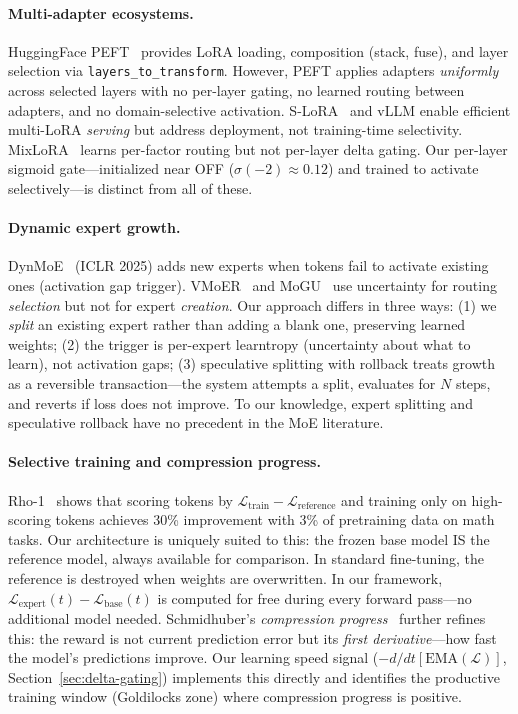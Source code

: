 \documentclass{article}
\begin{document}
\paragraph{Multi-adapter ecosystems.}
HuggingFace PEFT~\cite{peft2023} provides LoRA loading, composition (stack,
fuse), and layer selection via \texttt{layers\_to\_transform}. However, PEFT
applies adapters \emph{uniformly} across selected layers with no per-layer
gating, no learned routing between adapters, and no domain-selective
activation. S-LoRA~\cite{slora2023} and vLLM enable efficient multi-LoRA
\emph{serving} but address deployment, not training-time selectivity.
MixLoRA~\cite{mixlora2024} learns per-factor routing but not per-layer
delta gating. Our per-layer sigmoid gate---initialized near OFF
($\sigma(-2) \approx 0.12$) and trained to activate selectively---is
distinct from all of these.

\paragraph{Dynamic expert growth.}
DynMoE~\cite{dynmoe2025} (ICLR 2025) adds new experts when tokens fail to
activate existing ones (activation gap trigger). VMoER~\cite{vmoer2025} and
MoGU~\cite{mogu2025} use uncertainty for routing \emph{selection} but not
for expert \emph{creation}. Our approach differs in three ways: (1) we
\emph{split} an existing expert rather than adding a blank one, preserving
learned weights; (2) the trigger is per-expert learntropy (uncertainty about
what to learn), not activation gaps; (3) speculative splitting with rollback
treats growth as a reversible transaction---the system attempts a split,
evaluates for $N$ steps, and reverts if loss does not improve. To our
knowledge, expert splitting and speculative rollback have no precedent in
the MoE literature.

\paragraph{Selective training and compression progress.}
Rho-1~\cite{rho1_2024} shows that scoring tokens by
$\mathcal{L}_{\text{train}} - \mathcal{L}_{\text{reference}}$ and training
only on high-scoring tokens achieves 30\% improvement with 3\% of pretraining
data on math tasks. Our architecture is uniquely suited to this: the frozen
base model IS the reference model, always available for comparison. In standard
fine-tuning, the reference is destroyed when weights are overwritten. In our
framework, $\mathcal{L}_{\text{expert}}(t) - \mathcal{L}_{\text{base}}(t)$
is computed for free during every forward pass---no additional model needed.
Schmidhuber's \emph{compression progress}~\cite{schmidhuber2008} further
refines this: the reward is not current prediction error but its
\emph{first derivative}---how fast the model's predictions improve. Our
learning speed signal ($-d/dt[\text{EMA}(\mathcal{L})]$, Section~\ref{sec:delta-gating})
implements this directly and identifies the productive training window
(Goldilocks zone) where compression progress is positive.
\end{document}
